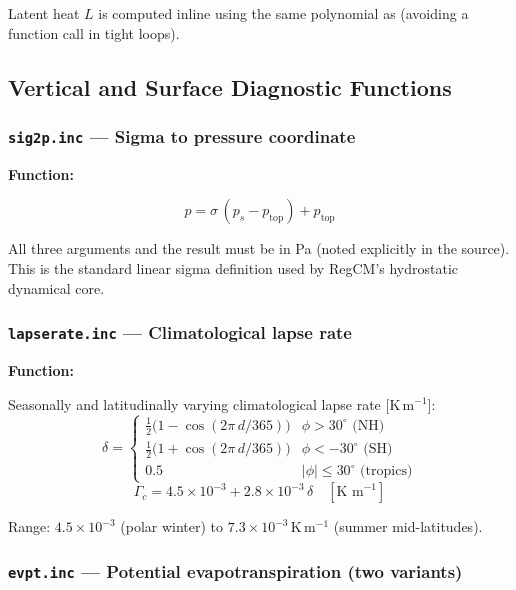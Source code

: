 Latent heat $L$ is computed inline using the same polynomial as 
(avoiding a function call in tight loops).

\subsection{Vertical and Surface Diagnostic Functions}

\subsubsection{\texttt{sig2p.inc} --- Sigma to pressure coordinate}

\textbf{Function:} 

\[
  p = \sigma\,(p_s - p_\text{top}) + p_\text{top}
\]

All three arguments and the result must be in Pa (noted explicitly in
the source). This is the standard linear sigma definition used by RegCM's
hydrostatic dynamical core.

\subsubsection{\texttt{lapserate.inc} --- Climatological lapse rate}

\textbf{Function:} 

Seasonally and latitudinally varying climatological lapse rate [K\,m$^{-1}$]:
\[
  \delta =
  \begin{cases}
    \tfrac{1}{2}\bigl(1 - \cos(2\pi\,d/365)\bigr) & \phi > 30^\circ\text{ (NH)} \\
    \tfrac{1}{2}\bigl(1 + \cos(2\pi\,d/365)\bigr) & \phi < -30^\circ\text{ (SH)} \\
    0.5                                             & |\phi| \leq 30^\circ\text{ (tropics)}
  \end{cases}
\]
\[
  \Gamma_c = 4.5\times10^{-3} + 2.8\times10^{-3}\,\delta \quad[\text{K m}^{-1}]
\]

Range: $4.5\times10^{-3}$ (polar winter) to $7.3\times10^{-3}$\,K\,m$^{-1}$
(summer mid-latitudes).

\subsubsection{\texttt{evpt.inc} --- Potential evapotranspiration (two variants)}


